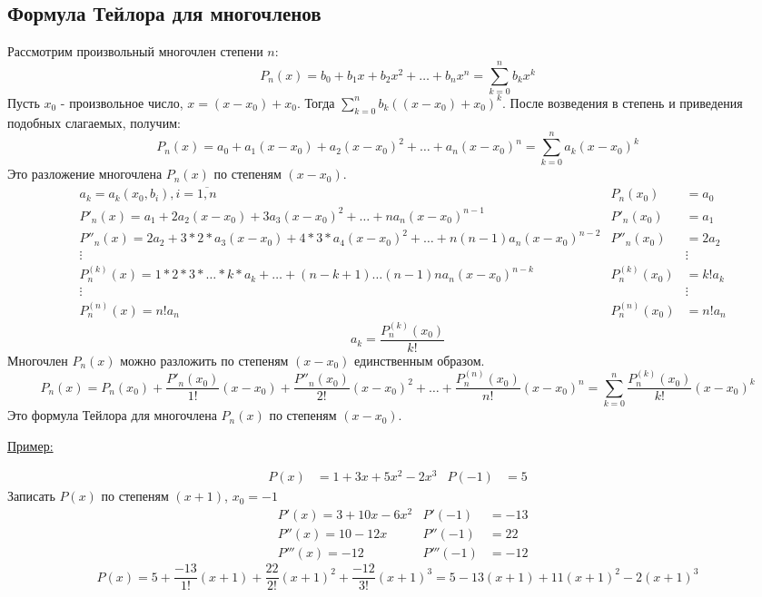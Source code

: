\documentclass[12pt]{article}
\begin{document}
    \subsection{Формула Тейлора для многочленов}
    Рассмотрим произвольный многочлен степени $n$:
    \[ P_n(x) = b_0 + b_1x + b_2x^2 + \dots + b_nx^n = \sum_{k=0}^{n}b_kx^k \]
    Пусть $x_0$ - произвольное число, $x = (x - x_0) + x_0$.
    Тогда $\sum_{k=0}^{n}b_k((x-x_0)+x_0)^k$. После возведения в степень и приведения подобных слагаемых, получим:
    \[ P_n(x) = a_0 + a_1(x- x_0) + a_2(x-x_0)^2 + \dots + a_n(x - x_0)^n = \sum_{k=0}^{n}a_k(x-x_0)^k \]
    Это разложение многочлена $P_n(x)$ по степеням $(x-x_0)$.
    \begin{align*}
        &a_k = a_k (x_0, b_i), i = \overline{1,n} & P_n(x_0) &= a_0\\
        &P'_n(x) = a_1 + 2a_2(x-x_0) + 3a_3(x-x_0)^2 + \dots + na_n(x-x_0)^{n-1} & P'_n(x_0) &= a_1\\
        &P''_n(x) = 2a_2 + 3*2*a_3(x-x_0) + 4*3*a_4(x-x_0)^2 + \dots + n(n-1)a_n(x-x_0)^{n-2} & P''_n(x_0) &= 2a_2\\
        &\vdots & &\vdots\\
        &P^{(k)}_n(x) = 1*2*3*\dots*k*a_k + \dots + (n-k+1) \dots (n-1)na_n(x-x_0)^{n-k} & P^{(k)}_n(x_0) &= k!a_k\\
        &\vdots & &\vdots\\
        &P^{(n)}_n(x) = n!a_n & P^{(n)}_n(x_0) &= n!a_n
    \end{align*}
    \[ \boxed{ a_k = \frac{P^{(k)}_n(x_0)}{k!} } \]
    Многочлен $P_n(x)$ можно разложить по степеням $(x - x_0)$ единственным образом.
    \[ P_n(x) = P_n(x_0) + \frac{P'_n(x_0)}{1!}(x-x_0) + \frac{P''_n(x_0)}{2!}(x-x_0)^2 + \dots + \frac{P^{(n)}_n(x_0)}{n!}(x-x_0)^n = \boxed{ \sum_{k=0}^{n}\frac{P^{(k)}_n(x_0)}{k!}(x-x_0)^k } \]
    Это формула Тейлора для многочлена $P_n(x)$ по степеням $(x-x_0)$.\par\noindent
    \underline{Пример:}
    \begin{adjustwidth}{1.5em}{1.5em}
        \begin{align*}
            P(x) &= 1 + 3x + 5x^2 - 2x^3 & P(-1) &= 5
        \end{align*}
        Записать $P(x)$ по степеням $(x + 1)$, $x_0 = -1$
        \begin{align*}
            &P'(x) = 3 + 10x - 6x^2 & P'(-1) &= -13\\
            &P''(x) = 10 - 12x & P''(-1) &= 22\\
            &P'''(x) = -12 & P'''(-1) &= -12
        \end{align*}
        \[ P(x) = 5 + \frac{-13}{1!}(x+1) + \frac{22}{2!}(x+1)^2 + \frac{-12}{3!}(x+1)^3 = 5 - 13(x+1) + 11(x+1)^2 - 2(x+1)^3 \]
    \end{adjustwidth}
\end{document}
